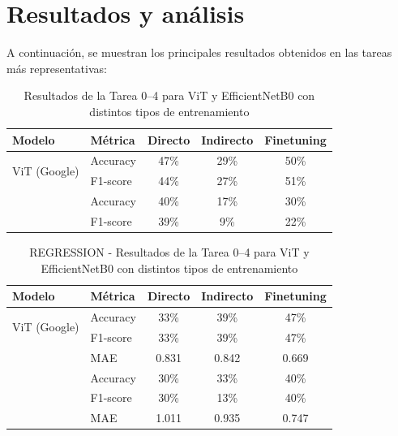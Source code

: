 \documentclass[11pt,spanish,listoffigures,listoftables]{tfgetsinf}
\begin{document}
\section{Resultados y análisis}
A continuación, se muestran los principales resultados obtenidos en las tareas más representativas:

\begin{table}[h]
    \centering
    \caption{Resultados de la Tarea 0--4 para ViT y EfficientNetB0 con distintos tipos de entrenamiento}
    \label{tab:model_comparison_results}
    \begin{tabular}{@{} l l c c c @{}} 
        \toprule
        \textbf{Modelo} & \textbf{Métrica} & \textbf{Directo} & \textbf{Indirecto} & \textbf{Finetuning} \\
        \midrule
        \multirow{2}{*}{ViT (Google)} 
            & Accuracy & 47\% & 29\% & 50\% \\
            & F1-score & 44\% & 27\% & 51\% \\
        \addlinespace
        \multirow{2}{*}{EfficientNetB0} 
            & Accuracy & 40\% & 17\% & 30\% \\
            & F1-score & 39\% &  9\% & 22\% \\
        \bottomrule
    \end{tabular}
\end{table}

\begin{table}[h]
    \centering
    \caption{REGRESSION - Resultados de la Tarea 0--4 para ViT y EfficientNetB0 con distintos tipos de entrenamiento}
    \label{tab:model_comparison_results}
    \begin{tabular}{@{} l l c c c @{}} 
        \toprule
        \textbf{Modelo} & \textbf{Métrica} & \textbf{Directo} & \textbf{Indirecto} & \textbf{Finetuning} \\
        \midrule
        \multirow{2}{*}{ViT (Google)} 
            & Accuracy & 33\%  & 39\%  & 47\% \\
            & F1-score & 33\%  & 39\%  & 47\% \\
            & MAE      & 0.831 & 0.842 & 0.669 \\
        \addlinespace
        \multirow{2}{*}{EfficientNetB0} 
            & Accuracy & 30\%  & 33\%  & 40\% \\
            & F1-score & 30\%  & 13\%  & 40\% \\
            & MAE      & 1.011 & 0.935 & 0.747 \\
        \bottomrule
    \end{tabular}
\end{table}
\end{document}
